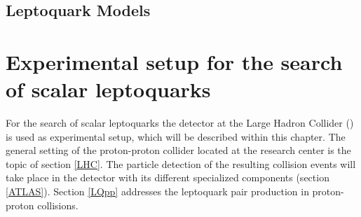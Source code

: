 \section{Leptoquark Models}\label{LQmodels}
\chapter{Experimental setup for the search of scalar leptoquarks}\label{experiment}
For the search of scalar leptoquarks the {\ATLAS} detector at the Large Hadron Collider ({\LHC}) is used as experimental setup, which will be described within this chapter. The general setting of the proton-proton collider located at the {\CERN} research center is the topic of section \ref{LHC}. The particle detection of the resulting collision events will take place in the {\ATLAS} detector with its different specialized components (section \ref{ATLAS}). Section \ref{LQpp} addresses the leptoquark pair production in proton-proton collisions.  
